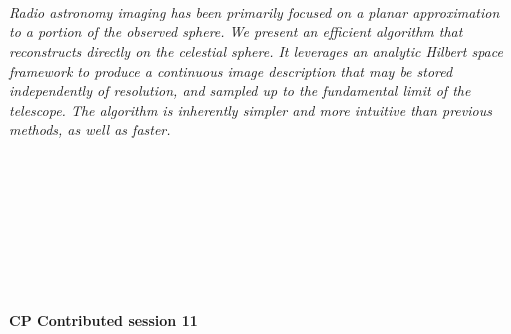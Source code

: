 \begin{multicols}{2}
        \\\\
\\
      \textit{Radio astronomy imaging has been primarily focused on a planar approximation to a portion of the observed sphere. We present an efficient algorithm that reconstructs directly on the celestial sphere. It leverages an analytic Hilbert space framework to produce a continuous image description that may be stored independently of resolution, and sampled up to the fundamental limit of the telescope. The algorithm is inherently simpler and more intuitive than previous methods, as well as faster.}\\
\\ 
        \\
        \\\\
        \\
        \\\\
\\
\end{multicols}
  \noindent\textbf{CP Contributed session 11}\\
  \textit{} \\
    
